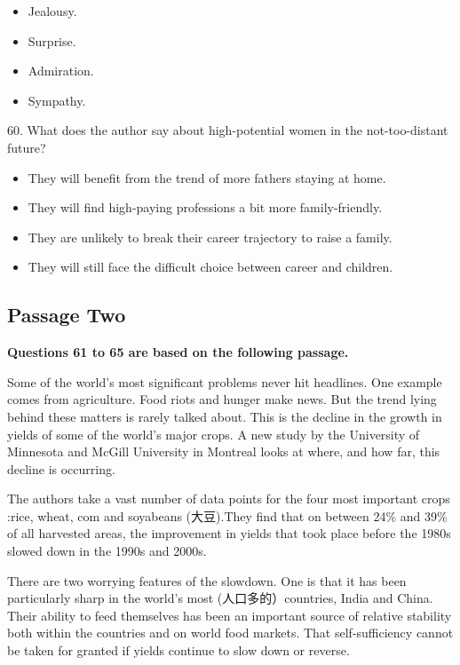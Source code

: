 \documentclass[UTF8,11pt]{ctexart}
\begin{document}
\begin{itemize}[leftmargin=2em,itemsep=.2em,topsep=.4em]\item[A.] Jealousy.
\item[B.] Surprise.
\item[C.] Admiration.
\item[D.] Sympathy.
\end{itemize}

60. What does the author say about high-potential women in the not-too-distant future?


\begin{itemize}[leftmargin=2em,itemsep=.2em,topsep=.4em]\item[A.] They will benefit from the trend of more fathers staying at home.
\item[B.] They will find high-paying professions a bit more family-friendly.
\item[C.] They are unlikely to break their career trajectory to raise a family.
\item[D.] They will still face the difficult choice between career and children.
\end{itemize}

\subsection*{Passage Two}


\textbf{Questions 61 to 65 are based on the following passage.}


Some of the world’s most significant problems never hit headlines. One example comes from agriculture. Food riots and hunger make news. But the trend lying behind these matters is rarely talked about. This is the decline in the growth in yields of some of the world’s major crops. A new study by the University of Minnesota and McGill University in Montreal looks at where, and how far, this decline is occurring.


The authors take a vast number of data points for the four most important crops :rice, wheat, com and soyabeans (大豆).They find that on between 24\% and 39\% of all harvested areas, the improvement in yields that took place before the 1980s slowed down in the 1990s and 2000s.


There are two worrying features of the slowdown. One is that it has been particularly sharp in the world’s most (人口多的）countries, India and China. Their ability to feed themselves has been an important source of relative stability both within the countries and on world food markets. That self-sufficiency cannot be taken for granted if yields continue to slow down or reverse.
\end{document}
